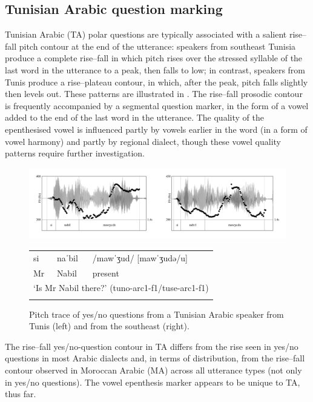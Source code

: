\documentclass[output=paper]{langsci/langscibook}
\begin{document}
 \subsection{Tunisian Arabic question marking} \label{tunis}


Tunisian Arabic (TA) polar questions are typically associated with a salient rise--fall pitch contour at the end of the utterance: speakers from southeast Tunisia produce a complete rise--fall in which pitch rises over the stressed syllable of the last word in the utterance to a peak, then falls to low; in contrast, speakers from Tunis produce a rise--plateau contour, in which, after the peak, pitch falls slightly then levels out. These patterns are illustrated in  \citep{BouchhiouaHellmuthAlmbark2019}. The rise--fall prosodic contour is frequently accompanied by a segmental question marker, in the form of a vowel added to the end of the last word in the utterance. The quality of the epenthesised vowel is influenced partly by vowels earlier in the word (in a form of vowel harmony) and partly by regional dialect, though these vowel quality patterns require further investigation.

  
\begin{figure}
\includegraphics[width=\textwidth]{figures/intonation-img1.png}
\caption{\label{fig:key:1}Pitch trace of yes/no questions from a Tunisian Arabic speaker from Tunis (left) and from the southeast (right).}

\begin{tabularx}{\textwidth}{llX}
\lsptoprule
si & naˈbil & /mawˈʒud/ [mawˈʒudə/u]\\
Mr & Nabil & present\\
\multicolumn{3}{l}{‘Is Mr Nabil there?’  (tuno-arc1-f1/tuse-arc1-f1)}\\
\lspbottomrule
\end{tabularx}
\end{figure}

The rise--fall yes/no-question contour in TA differs from the rise seen in yes/no questions in most Arabic dialects \citep{Hellmuthtoappearbook} and, in terms of distribution, from the rise--fall contour observed in Moroccan Arabic (MA) across all utterance types (not only in yes/no questions). The vowel epenthesis marker appears to be unique to TA, thus far.
\end{document}
